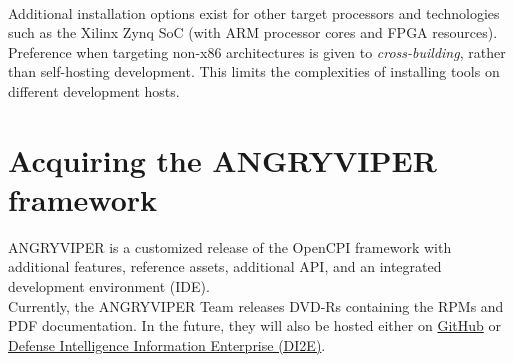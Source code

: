 \begin{center}
\end{center}
\ \\ %
Additional installation options exist for other target processors and technologies such as the Xilinx Zynq SoC (with ARM processor cores and FPGA resources). Preference when targeting non-x86 architectures is given to \textit{cross-building}, rather than self-hosting development. This limits the complexities of installing tools on different development hosts.
\iffalse
Installation of ANGRYVIPER is completed in the following steps:
\begin{enumerate}
\item\textbf{Section~\ref{sec:acquiring_av}}: Acquiring the ANGRYVIPER framework
\item\textbf{Section~\ref{sec:installing_prereq}}: Installing the ANGRYVIPER prerequisites
\item\textbf{Section~\ref{sec:install_av}}: Installing the ANGRYVIPER framework
\item\textbf{Section~\ref{sec:setup_av}}: Setting up the ANGRYVIPER environment
\item\textbf{Section~\ref{sec:testing_av}}: Testing the ANGRYVIPER installation
\end{enumerate}
These steps result in a development system with tooling and run-time software ready to support development and native execution of ANGRYVIPER components and applications.
\fi
\section{Acquiring the ANGRYVIPER framework}
\label{sec:acquiring_av}
ANGRYVIPER is a customized release of the OpenCPI framework with additional features, reference assets, additional API, and an integrated development environment (IDE).\\

Currently, the ANGRYVIPER Team releases DVD-Rs containing the RPMs and PDF documentation. In the future, they will also be hosted either on \href{https://github.com}{GitHub} or \href{https://devtools.di2e.net/}{Defense Intelligence Information Enterprise (DI2E)}.


